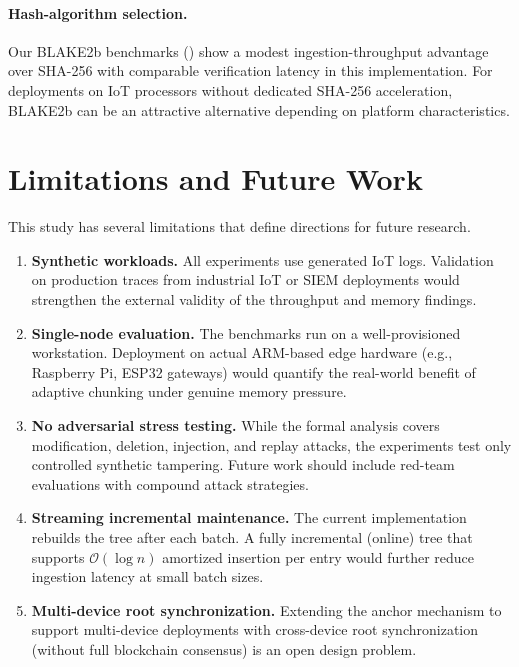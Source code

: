\documentclass[preprint,12pt]{elsarticle}
\begin{document}
\paragraph{Hash-algorithm selection.}
Our BLAKE2b benchmarks () show a modest ingestion-throughput advantage over SHA-256 with comparable verification latency in this implementation.
For deployments on IoT processors without dedicated SHA-256 acceleration, BLAKE2b can be an attractive alternative depending on platform characteristics.

\section{Limitations and Future Work}
\label{sec:limits}

This study has several limitations that define directions for future research.

\begin{enumerate}[leftmargin=*, label=\textbf{L\arabic*.}]
  \item \textbf{Synthetic workloads.}
    All experiments use generated IoT logs.
    Validation on production traces from industrial IoT or SIEM deployments would strengthen the external validity of the throughput and memory findings.

  \item \textbf{Single-node evaluation.}
    The benchmarks run on a well-provisioned workstation.
    Deployment on actual ARM-based edge hardware (e.g., Raspberry Pi, ESP32 gateways) would quantify the real-world benefit of adaptive chunking under genuine memory pressure.

  \item \textbf{No adversarial stress testing.}
    While the formal analysis covers modification, deletion, injection, and replay attacks, the experiments test only controlled synthetic tampering.
    Future work should include red-team evaluations with compound attack strategies.

  \item \textbf{Streaming incremental maintenance.}
    The current implementation rebuilds the tree after each batch.
    A fully incremental (online) tree that supports $\mathcal{O}(\log n)$ amortized insertion per entry would further reduce ingestion latency at small batch sizes.

  \item \textbf{Multi-device root synchronization.}
    Extending the anchor mechanism to support multi-device deployments with cross-device root synchronization (without full blockchain consensus) is an open design problem.
\end{enumerate}
\end{document}
